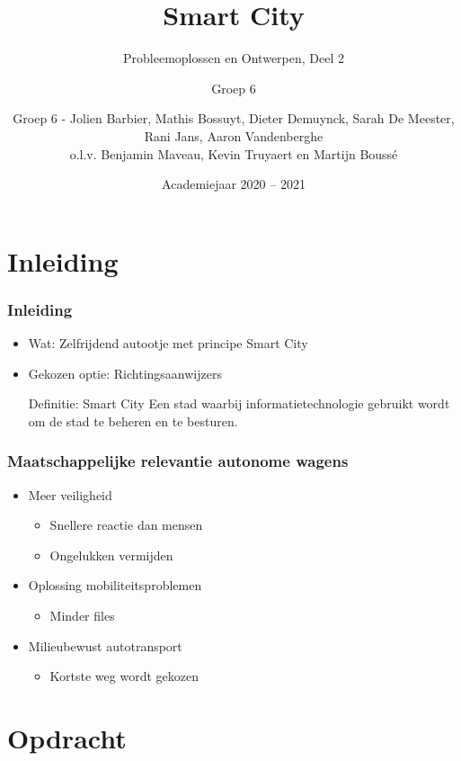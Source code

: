 \documentclass
   [kulak] %
   {kulakbeamer}
\title[Smart City]{Smart City}
\subtitle{\scriptsize Probleemoplossen en Ontwerpen, Deel 2}
\author[Groep 6]{Groep 6}%
\institute[Kulak]{ KU Leuven Kulak}
\date{Academiejaar 2020 -- 2021}
\author{\scriptsize Groep 6
	\tiny - Jolien Barbier, Mathis Bossuyt, Dieter Demuynck, Sarah De Meester, Rani Jans, Aaron Vandenberghe
	\\o.l.v. Benjamin Maveau, Kevin Truyaert en Martijn Boussé}
\begin{document}
\begin{titleframe}
\titlepage
\end{titleframe}


\section*{Inleiding}

\begin{frame}
\frametitle{Inleiding}
\begin{itemize}
	
	\item Wat: Zelfrijdend autootje met principe Smart City 
	\item Gekozen optie: Richtingsaanwijzers

	\begin{block}{Definitie: Smart City}
		Een stad waarbij informatietechnologie gebruikt wordt om de stad te beheren en te besturen. \cite{SmartCity}
	\end{block}
\end{itemize}
\end{frame}

\begin{frame}
\frametitle{Maatschappelijke relevantie autonome wagens}
\begin{itemize}
	\item Meer veiligheid
	\begin{itemize}
		\item Snellere reactie dan mensen
		\item Ongelukken vermijden
	\end{itemize}
	\item Oplossing mobiliteitsproblemen
	\begin{itemize}
		\item Minder files
	\end{itemize}
	\item Milieubewust autotransport
	\begin{itemize}
		\item Kortste weg wordt gekozen
	\end{itemize}

\end{itemize}
\end{frame}


\section[Opdracht]{Opdracht}%
\end{document}
